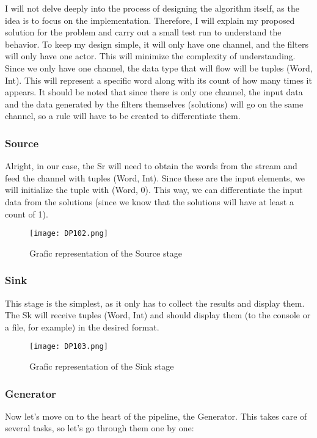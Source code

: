 I will not delve deeply into the process of designing the algorithm itself, as the idea is to focus on the implementation.
Therefore, I will explain my proposed solution for the problem and carry out a small test run to understand the behavior.
To keep my design simple, it will only have one channel, and the filters will only have one actor.
This will minimize the complexity of understanding. Since we only have one channel, the data type that will flow will be tuples (Word, Int).
This will represent a specific word along with its count of how many times it appears.
It should be noted that since there is only one channel, the input data and the data generated by the filters themselves (solutions) will go on the same channel, so a rule will have to be created to differentiate them.

\subsubsection*{Source}
Alright, in our case, the Sr will need to obtain the words from the stream and feed the channel with tuples (Word, Int).
Since these are the input elements, we will initialize the tuple with (Word, 0).
This way, we can differentiate the input data from the solutions (since we know that the solutions will have at least a count of 1).

\begin{figure}[H]
    \centering
    \texttt{[image: DP102.png]}
    \caption[{[Lib]} Source stage]{Grafic representation of the Source stage}
    \label{fig:DP102}
\end{figure}

\subsubsection*{Sink}
This stage is the simplest, as it only has to collect the results and display them.
The Sk will receive tuples (Word, Int) and should display them (to the console or a file, for example) in the desired format.

\begin{figure}[H]
    \centering
    \texttt{[image: DP103.png]}
    \caption[{[Lib]} Sink stage]{Grafic representation of the Sink stage}
    \label{fig:DP103}
\end{figure}

\subsubsection*{Generator}
Now let's move on to the heart of the pipeline, the Generator.
This takes care of several tasks, so let's go through them one by one:

